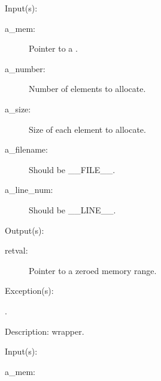 \begin{capi}
\label{mem_calloc}
\label{cw_calloc}
	\begin{capilist}
	\item[Input(s): ]
		\begin{description}\item[]
		\item[a\_mem: ]
			Pointer to a .
		\item[a\_number: ]
			Number of elements to allocate.
		\item[a\_size: ]
			Size of each element to allocate.
		\item[a\_filename: ]
			Should be \_\_FILE\_\_.
		\item[a\_line\_num: ]
			Should be \_\_LINE\_\_.
		\end{description}
	\item[Output(s): ]
		\begin{description}\item[]
		\item[retval: ]
			Pointer to a zeroed memory range.
		\end{description}
	\item[Exception(s): ]
		\begin{description}\item[]
		\item[.]
		\end{description}
	\item[Description: ]
		 wrapper.
	\end{capilist}
\label{mem_realloc_e}
\label{mem_realloc}
\label{cw_realloc}
	\begin{capilist}
	\item[Input(s): ]
		\begin{description}\item[]
		\item[a\_mem: ]

\end{description}
\end{capilist}
\end{capi}
